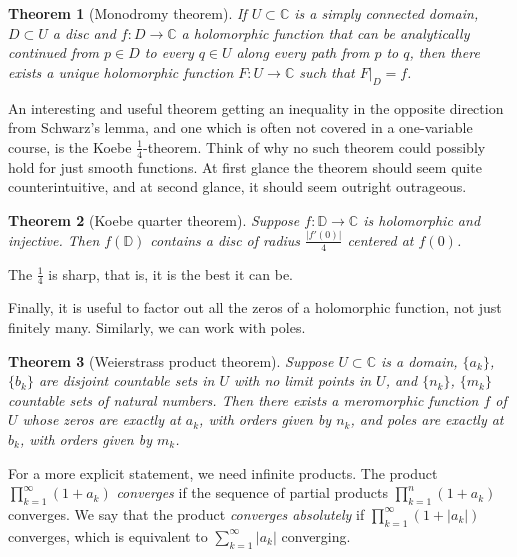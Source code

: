 \documentclass[12pt,openany]{book}
\newcommand{\sabs}[1]{\lvert {#1} \rvert}
\newcommand{\C}{{\mathbb{C}}}
\newcommand{\D}{{\mathbb{D}}}
\theoremstyle{plain}
\newtheorem{thm}{Theorem}[section]
\theoremstyle{remark}
\theoremstyle{definition}
\theoremstyle{exercise}
\theoremstyle{example}
\begin{document}
\begin{thm}[Monodromy theorem]
If $U \subset \C$ is a simply connected domain, $D \subset U$ a disc and
$f \colon D \to \C$ a holomorphic function that can be analytically
continued from $p \in D$ to every $q \in U$ along every path from $p$ to $q$, then there exists
a unique holomorphic function $F \colon U \to \C$ such that $F|_D = f$.
\end{thm}

\medskip

An interesting and useful theorem getting an inequality in the opposite
direction from
Schwarz's lemma, and one which is often not covered in a one-variable
course, is the Koebe $\frac{1}{4}$-theorem.
Think of why no such theorem could possibly hold for just smooth
functions.  At first glance the theorem should seem quite counterintuitive,
and at second glance, it should seem outright outrageous.

\begin{thm}[Koebe quarter theorem]
Suppose $f \colon \D \to \C$ is holomorphic and injective.  Then
$f(\D)$ contains a disc of radius $\frac{\sabs{f'(0)}}{4}$ centered at $f(0)$.
\end{thm}

The $\frac{1}{4}$ is sharp, that is, it is the best it can be.

\medskip

Finally, it is useful to factor out all the zeros of a holomorphic function,
not just finitely many.  Similarly, we can work with poles.

\begin{thm}[Weierstrass product theorem]
Suppose $U \subset \C$ is a domain, $\{ a_k \}$, $\{ b_k \}$ are
disjoint countable sets in $U$
with no limit points in $U$, and $\{ n_k \}$, $\{ m_k \}$ countable sets of
natural numbers.
Then there exists a meromorphic function $f$ of $U$ whose
zeros are exactly at $a_k$, with orders given by $n_k$, and
poles are exactly at $b_k$, with orders given by $m_k$.
\end{thm}

For a more explicit statement, we need infinite products.  The product
$\prod_{k=1}^\infty (1+a_k)$
\emph{converges} if the sequence of partial products
$\prod_{k=1}^n (1+a_k)$ converges.  We say that the product
\emph{converges absolutely} if
$\prod_{k=1}^\infty (1+\sabs{a_k})$
converges, which is equivalent to $\sum_{k=1}^\infty \sabs{a_k}$ converging.
\end{document}
